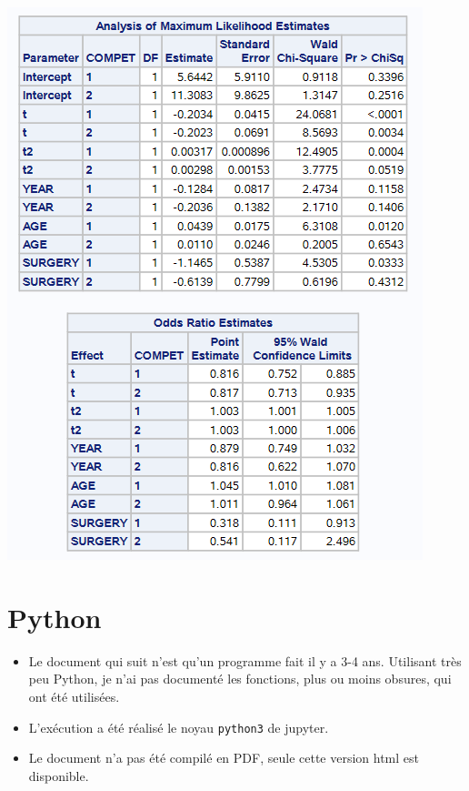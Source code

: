 \documentclass[
  12pt,
  letterpaper,
  DIV=11,
  numbers=noendperiod,
  onepage,
  openany]{scrreprt}
\providecommand{\tightlist}{%
  \setlength{\itemsep}{0pt}\setlength{\parskip}{0pt}}\usepackage{longtable,booktabs,array}
\begin{document}
\includegraphics{sas/9j.PNG}

\hypertarget{python-6}{%
\chapter{\texorpdfstring{\textbf{Python}}{Python}}\label{python-6}}

\begin{tcolorbox}[enhanced jigsaw, arc=.35mm, bottomrule=.15mm, titlerule=0mm, colbacktitle=quarto-callout-note-color!10!white, left=2mm, opacitybacktitle=0.6, toprule=.15mm, title=\textcolor{quarto-callout-note-color}{\faInfo}\hspace{0.5em}{Note}, colframe=quarto-callout-note-color-frame, breakable, coltitle=black, opacityback=0, toptitle=1mm, bottomtitle=1mm, rightrule=.15mm, leftrule=.75mm, colback=white]

\begin{itemize}
\tightlist
\item
  Le document qui suit n'est qu'un programme fait il y a 3-4 ans.
  Utilisant très peu Python, je n'ai pas documenté les fonctions, plus
  ou moins obsures, qui ont été utilisées.
\item
  L'exécution a été réalisé le noyau \texttt{python3} de jupyter.
\item
  Le document n'a pas été compilé en PDF, seule cette version html est
  disponible.
\end{itemize}

\end{tcolorbox}
\end{document}
